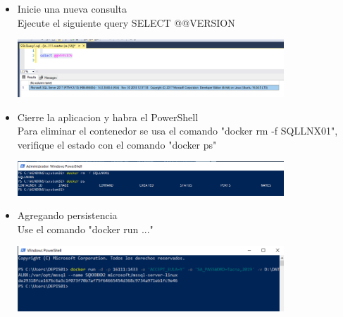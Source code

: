 \begin{itemize}
	\item Inicie una nueva consulta
	\\Ejecute el siguiente query SELECT @@VERSION

	\begin{center}
	\includegraphics[width=10cm]{./Imagenes/12} 
	\end{center}

\end{itemize} 

\begin{itemize}
	\item Cierre la aplicacion y habra el PowerShell
	\\Para eliminar el contenedor se usa el comando "docker rm -f SQLLNX01", verifique el estado con el comando "docker ps"

	\begin{center}
	\includegraphics[width=10cm]{./Imagenes/13} 
	\end{center}

\end{itemize} 

\begin{itemize}
	\item Agregando persistencia
	\\Use el comando "docker run ..."

	\begin{center}
	\includegraphics[width=10cm]{./Imagenes/15} 
	\end{center}

\end{itemize} 

